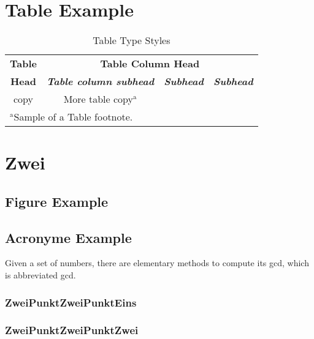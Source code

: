 \section{Table  Example}

\begin{table}[htbp]
	\begin{center}
		\begin{tabular}{|c|c|c|c|}
			\hline
			\textbf{Table}&\multicolumn{3}{|c|}{\textbf{Table Column Head}} \\
			\cline{2-4} 
			\textbf{Head} & \textbf{\textit{Table column subhead}}& \textbf{\textit{Subhead}}& \textbf{\textit{Subhead}} \\
			\hline
			copy& More table copy$^{\mathrm{a}}$& &  \\
			\hline
			\multicolumn{4}{l}{$^{\mathrm{a}}$Sample of a Table footnote.}
		\end{tabular}
		\caption{Table Type Styles}
		\label{tab1}
	\end{center}
\end{table}

\section{Zwei}

\subsection{Figure Example}


\subsection{Acronyme Example}

Given a set of numbers, there are elementary methods to compute its \acrlong{gcd}, which is abbreviated \acrshort{gcd}. \parencite[s.][]{2020_latex}

\noindent \subsubsection{ZweiPunktZweiPunktEins}

\noindent \subsubsection{ZweiPunktZweiPunktZwei}